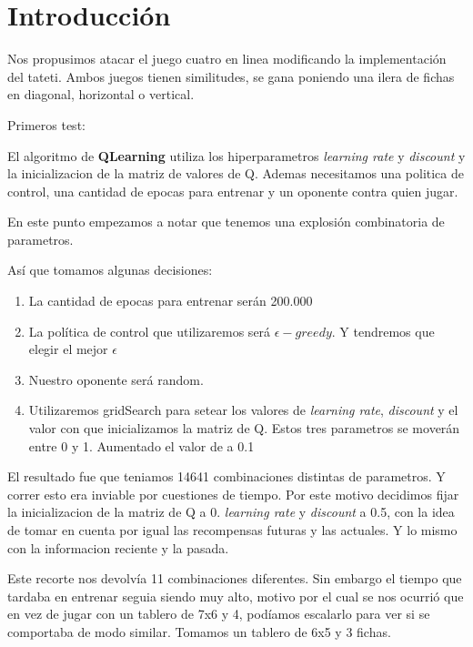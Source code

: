 \section{Introducción}

Nos propusimos atacar el juego cuatro en linea modificando la implementación del tateti. 
Ambos juegos tienen similitudes, se gana poniendo una ilera de fichas en diagonal, horizontal o vertical.  

Primeros test:

El algoritmo de \textbf{QLearning} utiliza los hiperparametros \textit{learning rate} y \textit{discount} y la inicializacion de la matriz de valores de Q.
Ademas necesitamos una politica de control, una cantidad de epocas para entrenar y un oponente contra quien jugar.  

En este punto empezamos a notar que tenemos una explosión combinatoria de parametros. 

Así que tomamos algunas decisiones:

\begin{enumerate}
\item La cantidad de epocas para entrenar serán 200.000
\item La política de control que utilizaremos será \textbf{$\epsilon-greedy$}. Y tendremos que elegir el mejor $\epsilon$
\item Nuestro oponente será random.
\item Utilizaremos gridSearch para setear los valores de \textit{learning rate},  \textit{discount} y el valor con que inicializamos la matriz de Q. Estos tres parametros se moverán entre 0 y 1. Aumentado el valor de a 0.1
\end{enumerate}


El resultado fue que teniamos 14641 combinaciones distintas de parametros. Y correr esto 
era inviable por cuestiones de tiempo.
Por este motivo decidimos fijar la inicializacion de la matriz de Q a 0. \textit{learning rate} y \textit{discount} a 0.5, con la idea de tomar en cuenta por igual las recompensas futuras y las actuales. Y lo mismo con la informacion reciente y la pasada. 

Este recorte nos devolvía 11 combinaciones diferentes. Sin embargo el tiempo que tardaba en entrenar seguia siendo muy alto, motivo por el cual se nos ocurrió que en vez de jugar con un tablero de 7x6 y 4, podíamos escalarlo para ver si se comportaba de modo similar. Tomamos un tablero de 6x5 y 3 fichas. 



